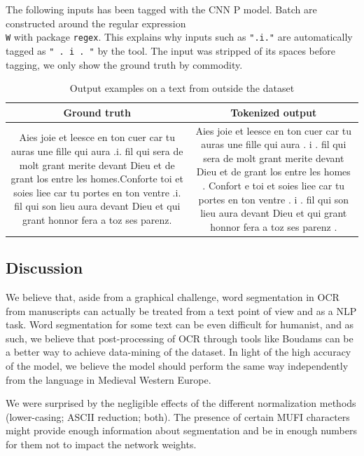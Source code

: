 \documentclass{jdmdh}
\begin{document}
The following inputs has been tagged with the CNN P model. Batch are constructed around the regular expression \texttt{\\W} with package \texttt{regex}. This explains why inputs such as \texttt{".i."} are automatically tagged as \texttt{" . i . "} by the tool. The input was stripped of its spaces before tagging, we only show the ground truth by commodity.

\begin{table}[!ht]
\centering
\begin{tabularx}{\textwidth}{|C|C|}
\hline
\textbf{Ground truth} & \textbf{Tokenized output} \\\hline
Aies joie et leesce en ton cuer car tu auras une fille qui aura .i. fil qui sera de molt grant merite devant Dieu et de grant los entre les homes.Conforte toi et soies liee car tu portes en ton ventre .i. fil qui son lieu aura devant Dieu et qui grant honnor fera a toz ses parenz. & Aies joie et leesce en ton cuer car tu auras une fille qui aura .  i .  fil qui sera de molt grant merite devant Dieu et de grant los entre les homes .  Confort e toi et soies liee car tu portes en ton ventre .  i .  fil qui son lieu aura devant Dieu et qui grant honnor fera a toz ses parenz .
\\\hline
\end{tabularx}
\caption{Output examples on a text from outside the dataset}
\label{tab:example_output}
\end{table}

\subsection{Discussion}

We believe that, aside from a graphical challenge, word segmentation in OCR from manuscripts can actually be treated from a text point of view and as a NLP task. Word segmentation for some text can be even difficult for humanist, and as such, we believe that post-processing of OCR through tools like Boudams can be a better way to achieve data-mining of the dataset. In light of the high accuracy of the model, we believe the model should perform the same way independently from the language in Medieval Western Europe.

We were surprised by the negligible effects of the different normalization methods (lower-casing; ASCII reduction; both). The presence of certain MUFI characters might provide enough information about segmentation and be in enough numbers for them not to impact the network weights.
\end{document}
